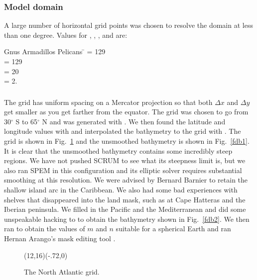 \subsubsection{Model domain}
A large number of horizontal grid points was chosen to resolve the
domain at less than one degree.  Values for , ,
, and  are:
\begin{tabbing}
  Gnus Armadillos Pelicans \= \kill
  \>  = 129 \\
  \>  = 129 \\
  \>  = 20 \\
  \>  = 2.
\end{tabbing}

\subsubsection{}
The grid has uniform spacing on a Mercator projection so that both
$\Delta x$ and $\Delta y$ get smaller as you get farther from the
equator.  The grid was chosen to go from 30$^\circ$ S to 65$^\circ$ N
and was generated with .  We then found the latitude and
longitude values with  and interpolated the 
bathymetry to the grid with .  The grid is shown in
Fig.\ \ref{fdg} and the unsmoothed bathymetry is shown in Fig.\
\ref{fdb1}.  It is clear that the unsmoothed bathymetry contains some
incredibly steep regions.  We have not pushed SCRUM to see what its
steepness limit is, but we also ran SPEM in this configuration and its
elliptic solver requires substantial smoothing at this resolution.
We were advised by Bernard Barnier to retain the shallow island
arc in the Caribbean.  We also had some bad experiences with shelves
that disappeared into the land mask, such as at Cape Hatteras and
the Iberian peninsula.  We filled in the Pacific and the Mediterranean
and did some unspeakable hacking to \code{bathsuds} to obtain the
bathymetry shown in Fig.\ \ref{fdb2}.  We then ran \code{sphere} to
obtain the values of $m$ and $n$ suitable for a spherical Earth and ran
Hernan Arango's mask editing tool \code{scrum\_mask}.

\begin{figure}
\setlength{\unitlength}{1cm}
  \begin{picture}(12,16)(-.72,0)
  \end{picture}
\caption{The North Atlantic grid.}
\label{fdg}
\end{figure}

